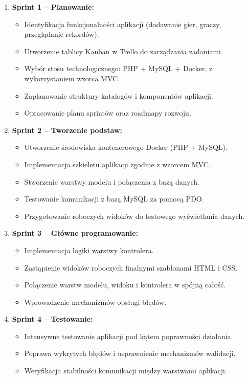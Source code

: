 \documentclass[12pt,a4paper]{article}
\begin{document}
\begin{enumerate}
	\item \textbf{Sprint 1 -- Planowanie:}
	\begin{itemize}
		\item Identyfikacja funkcjonalności aplikacji (dodawanie gier, graczy, przeglądanie rekordów).
		\item Utworzenie tablicy Kanban w Trello do zarządzania zadaniami.
		\item Wybór stosu technologicznego: PHP + MySQL + Docker, z wykorzystaniem wzorca MVC.
		\item Zaplanowanie struktury katalogów i komponentów aplikacji.
		\item Opracowanie planu sprintów oraz roadmapy rozwoju.
	\end{itemize}
	\item \textbf{Sprint 2 -- Tworzenie podstaw:}
	\begin{itemize}
		\item Utworzenie środowiska kontenerowego Docker (PHP + MySQL).
		\item Implementacja szkieletu aplikacji zgodnie z wzorcem MVC.
		\item Stworzenie warstwy modelu i połączenia z bazą danych.
		\item Testowanie komunikacji z bazą MySQL za pomocą PDO.
		\item Przygotowanie roboczych widoków do testowego wyświetlania danych.
	\end{itemize}
	\item \textbf{Sprint 3 -- Główne programowanie:}
	\begin{itemize}
		\item Implementacja logiki warstwy kontrolera.
		\item Zastąpienie widoków roboczych finalnymi szablonami HTML i CSS.
		\item Połączenie warstw modelu, widoku i kontrolera w spójną całość.
		\item Wprowadzenie mechanizmów obsługi błędów.
	\end{itemize}
	\item \textbf{Sprint 4 -- Testowanie:}
	\begin{itemize}
		\item Intensywne testowanie aplikacji pod kątem poprawności działania.
		\item Poprawa wykrytych błędów i usprawnienie mechanizmów walidacji.
		\item Weryfikacja stabilności komunikacji między warstwami aplikacji.

\end{itemize}
\end{enumerate}
\end{document}
